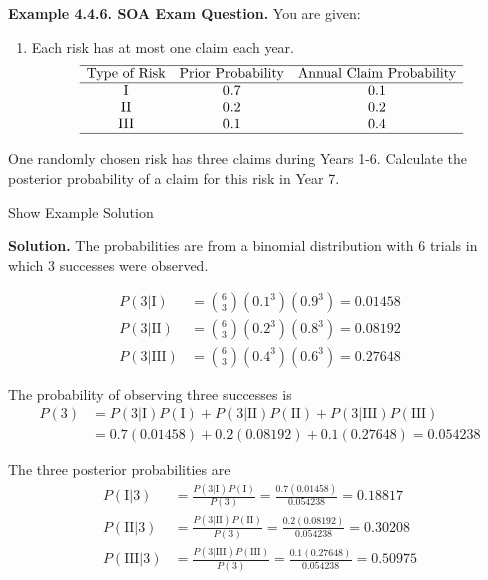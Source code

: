 \documentclass[]{book}
\providecommand{\tightlist}{%
  \setlength{\itemsep}{0pt}\setlength{\parskip}{0pt}}
\theoremstyle{definition}
\theoremstyle{definition}
\theoremstyle{definition}
\theoremstyle{remark}
\begin{document}
\textbf{Example 4.4.6. SOA Exam Question.} You are given:

\begin{enumerate}
\def\labelenumi{(\roman{enumi})}
\tightlist
\item
  Each risk has at most one claim each year. \[\begin{array}{ccc}
  \hline
  \text{Type of Risk} & \text{Prior Probability} & \text{Annual Claim Probability} \\
  \hline
  \text{I} & 0.7 & 0.1 \\
  \text{II} & 0.2 & 0.2 \\
  \text{III} & 0.1 & 0.4 \\ 
  \hline
  \end{array}\]
\end{enumerate}

One randomly chosen risk has three claims during Years 1-6. Calculate
the posterior probability of a claim for this risk in Year 7.

Show Example Solution

\hypertarget{toggleExampleSelect.4.6}{}
\textbf{Solution.} The probabilities are from a binomial distribution
with 6 trials in which 3 successes were observed.

\[\begin{aligned} 
P(3|\text{I}) &= {6 \choose 3} (0.1^3)(0.9^3) = 0.01458 \\
P(3|\text{II}) &= {6 \choose 3} (0.2^3)(0.8^3) = 0.08192 \\
P(3|\text{III}) &= {6 \choose 3} (0.4^3)(0.6^3) = 0.27648
\end{aligned}\]

The probability of observing three successes is
\[\begin{aligned} P(3) &= P(3|\text{I})P(\text{I}) + P(3|\text{II})P(\text{II}) + P(3|\text{III})P(\text{III}) \\
&=  0.7(0.01458) + 0.2(0.08192) + 0.1(0.27648) = 0.054238
\end{aligned}\]

The three posterior probabilities are \[\begin{aligned}
P(\text{I}|3) &= \frac{P(3|\text{I})P(\text{I})}{P(3)} = \frac{0.7(0.01458)}{0.054238} = 0.18817 \\
P(\text{II}|3) &= \frac{P(3|\text{II})P(\text{II})}{P(3)} = \frac{0.2(0.08192)}{0.054238} = 0.30208 \\
P(\text{III}|3) &= \frac{P(3|\text{III})P(\text{III})}{P(3)} = \frac{0.1(0.27648)}{0.054238} = 0.50975 
\end{aligned}\]
\end{document}
